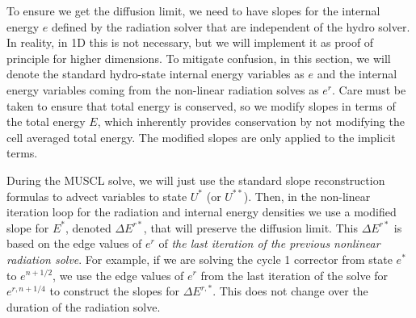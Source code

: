 To ensure we get the diffusion limit, we need to have slopes for the internal energy
$e$ defined by the radiation
solver that are independent of the hydro solver.  In reality, in 1D this is not
necessary, but we will implement it as proof of principle for higher dimensions.   To mitigate confusion, in this
section, we will denote the standard hydro-state internal energy variables as $e$ and
the internal energy variables coming from the non-linear radiation solves as $e^r$. Care must be taken to
ensure that total energy is conserved, so we modify slopes in terms of the total
energy $E$, which inherently provides conservation by not modifying the cell averaged
total energy.  The modified slopes are only applied to the implicit terms. 

During the MUSCL solve, we
will just use the standard slope reconstruction formulas to advect variables to
state $U^*$ (or $U^{**}$).  Then, in the non-linear iteration loop for the radiation
and internal energy densities we use a modified slope for $E^*$, denoted $\Delta E^{r*}$, that will preserve the diffusion
limit.  This $\Delta E^{r*}$ is based on the edge values of $e^r$ of \emph{the last iteration of the previous
nonlinear radiation solve}.  For example, if we are solving the cycle 1 corrector from state $e^*$ to
$e^{n+1/2}$, we use the edge values of $e^r$ from the last iteration of the solve for
$e^{r,n+1/4}$ to construct the slopes for $\Delta E^{r,*}$. This does not change over
the duration of the radiation solve.  

